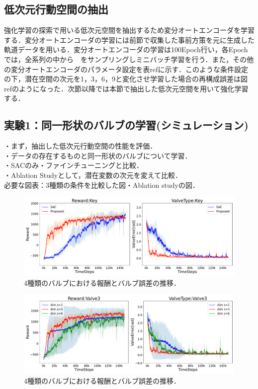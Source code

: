 \documentclass[dvipdfmx]{ampbt_nomag}
\begin{document}
\subsection{低次元行動空間の抽出}
強化学習の探索で用いる低次元空間を抽出するため変分オートエンコーダを学習する．変分オートエンコーダの学習には前節で収集した事前方策を元に生成した軌道データを用いる．変分オートエンコーダの学習は100Epoch行い，各Epochでは，全系列の中から　をサンプリングしミニバッチ学習を行う．また，その他の変分オートエンコーダのパラメータ設定を表ref{}に示す．このような条件設定の下，潜在空間の次元を1，3，6，9と変化させ学習した場合の再構成誤差は図ref{}のようになった．次節以降では本節で抽出した低次元空間を用いて強化学習する．



\subsection{実験1：同一形状のバルブの学習(シミュレーション)}
・まず，抽出した低次元行動空間の性能を評価．\\
・データの存在するものと同一形状のバルブについて学習．\\
・SACのみ・ファインチューニングと比較．\\
・Ablation Studyとして，潜在変数の次元を変えて比較．\\
必要な図表：3種類の条件を比較した図・Ablation studyの図．\\
\begin{figure}[H]
  \centering
  \includegraphics[width=16cm]
       {asset/img/SimTurn180Valve3.pdf}
  \caption{4種類のバルブにおける報酬とバルブ誤差の推移．}
  \label{dclaw_mujoco}
\end{figure}

\begin{figure}[H]
  \centering
  \includegraphics[width=16cm]
       {asset/img/SimValve3LatentDim.pdf}
  \caption{4種類のバルブにおける報酬とバルブ誤差の推移．}
  \label{dclaw_mujoco}
\end{figure}
\end{document}
